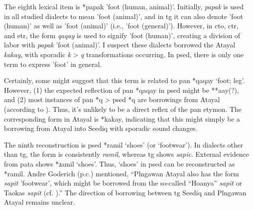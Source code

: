 The eighth lexical item is *papak 'foot (human, animal)'. Initially, \textit{papak} is used in all studied dialects to mean 'foot (animal)', and in \acl{tg} it can also denote 'foot (human)' as well as 'foot (animal)' (i.e., 'foot (general)'). However, in \acl{cto}, \acl{ctr}, and \acl{etr}, the form \textit{qaqay} is used to signify 'foot (human)', creating a division of labor with \textit{papak} 'foot (animal)'. I suspect these dialects borrowed the Atayal \textit{kakay}, with sporadic \textit{k} > \textit{q} transformations occurring. In \acl{psed}, there is only one term to express 'foot' in general.


Certainly, some might suggest that this term is related to \acl{pan} *qaqay `foot; leg'. However, (1) the expected reflection of \acs{pan} *qaqay in \acl{psed} might be **aay(?), and (2) most instances of \acs{pan} *q > \acs{psed} *q are borrowings from Atayal (according to \textcite{song2024sedq}). Thus, it's unlikely to be a direct reflex of the \acs{pan} etymon. The corresponding form in Atayal is *kakay, indicating that this might simply be a borrowing from Atayal into Seediq with sporadic sound changes.


The ninth reconstruction is \acl{psed} *ramil `shoes' (or `footwear'). In dialects other than \acl{tg}, the form is consistently \textit{ramil}, whereas \acl{tg} shows \textit{sapic}. External evidence from \acl{pata} shows *ɹamil `shoes'. Thus, `shoes' in \acl{psed} can be reconstructed as *ramil. Andre Goderich (p.c.) mentioned, ``Plngawan Atayal also has the form \textit{sapit} 'footwear', which might be borrowed from the so-called ``Hoanya'' \textit{sapit} or Taokas \textit{sapit} (cf. \cite[80]{tsuchida1982wp}).'' The direction of borrowing between \acl{tg} Seediq and Plngawan Atayal remains unclear.

